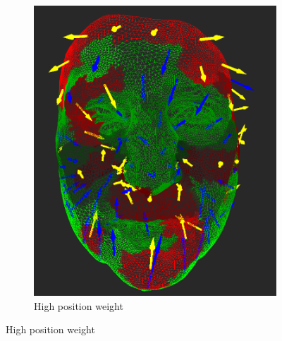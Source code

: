 \begin{figure}[h]
\begin{subfigure}{0.3\textwidth}
	\includegraphics[width=\textwidth]{./img/meshdiff-high_position.PNG}
	\caption{High position weight}
	\label{fig:meshdiff_high_position}
	\end{subfigure}
    

\end{figure}
